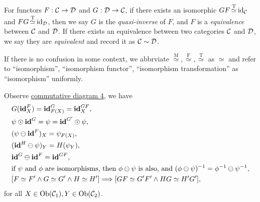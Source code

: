 \documentclass{article}
\begin{document}
\begin{defi}
	For functors $F:\mathcal{C}\to\mathcal{D}$ and $G:\mathcal{D}\to\mathcal{C}$, if there exists an isomorphic $GF\mathop{\simeq}\limits^\mathrm{T}\mathrm{id}_{\mathcal{C}}$ and $FG\mathop{\simeq}\limits^\mathrm{T}\mathrm{id}_{\mathcal{D}}$, then we say $G$ is the \emph{quasi-inverse} of $F$, and $F$ is a \emph{equivalence} between $\mathcal{C}$ and $\mathcal{D}$. If there exists an equivalence between two categories $\mathcal{C}$ and $\mathcal{D}$, we say they are \emph{equivalent} and record it as $\mathcal{C}\sim\mathcal{D}$.
	
	If there is no confusion in some context, we abbrviate $\mathop{\simeq}\limits^\mathrm{M},\mathop{\simeq}\limits^\mathrm{F},\mathop{\simeq}\limits^\mathrm{T}$ as $\simeq$ and refer to ``isomorphism'', ``isomorphism functor'', ``isomorphism transformation'' as ``isomorphism'' uniformly.
\end{defi}


\begin{lmm}
	Observe \hyperref[ass]{commutative diagram 4}, we have
	\begin{align}
		& G(\tid^F_X)=\tid^G_{F(X)}=\tid^{GF}_X,\label{0}\\
		& \psi\odot\tid^G=\psi=\tid^{G'}\odot\psi,\label{1}\\
		& (\psi\ominus\tid^F)_X=\psi_{F(X)},\label{2}\\
		& (\tid^H\ominus\psi)_Y=H(\psi_Y),\label{3}\\
		& \tid^G\ominus\tid^F=\tid^{GF},\label{4}\\
		& \text{if\ }\psi\text{\ and\ }\phi\text{\ are\ isomorphisms,\ then\ }\phi\ominus\psi\text{\ is\ also,\ and\ }(\phi\ominus\psi)\iv=\phi\iv\ominus\psi\iv,\label{5}\\
		& [F\simeq F'\wedge G\simeq G'\wedge H\simeq H']\Longrightarrow[GF\simeq G'F'\wedge HG\simeq H'G'],\label{6}
	\end{align}
	for all $X\in\mathrm{Ob}(\mathcal{C}_1),Y\in\mathrm{Ob}(\mathcal{C}_2)$.
\end{lmm}
\end{document}

